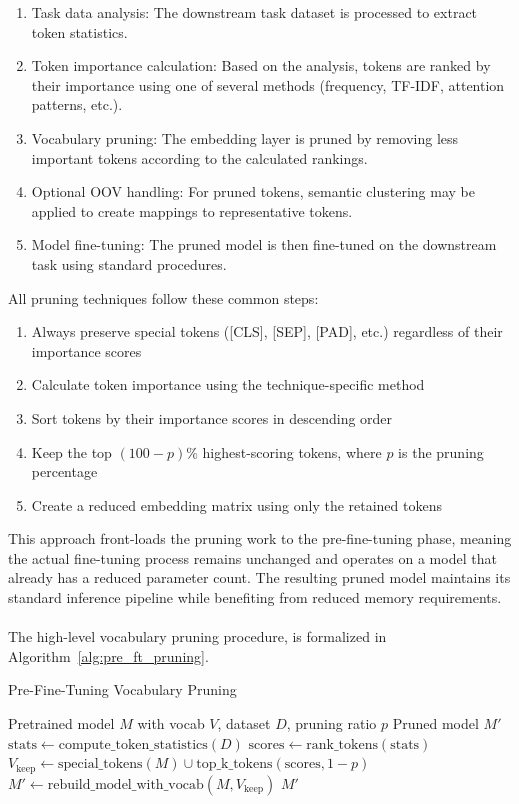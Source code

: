 \documentclass[twocolumn]{article}
\begin{document}
\begin{enumerate}
    \item Task data analysis: The downstream task dataset is processed to extract token statistics.
    \item Token importance calculation: Based on the analysis, tokens are ranked by their importance using one of several methods (frequency, TF-IDF, attention patterns, etc.).
    \item Vocabulary pruning: The embedding layer is pruned by removing less important tokens according to the calculated rankings.
    \item Optional OOV handling: For pruned tokens, semantic clustering may be applied to create mappings to representative tokens.
    \item Model fine-tuning: The pruned model is then fine-tuned on the downstream task using standard procedures.
\end{enumerate}
All pruning techniques follow these common steps:
\begin{enumerate}
    \item Always preserve special tokens ([CLS], [SEP], [PAD], etc.) regardless of their importance scores
    \item Calculate token importance using the technique-specific method
    \item Sort tokens by their importance scores in descending order
    \item Keep the top $(100-p)\%$ highest-scoring tokens, where $p$ is the pruning percentage
    \item Create a reduced embedding matrix using only the retained tokens
\end{enumerate}
This approach front-loads the pruning work to the pre-fine-tuning phase, meaning the actual fine-tuning process remains unchanged and operates on a model that already has a reduced parameter count. The resulting pruned model maintains its standard inference pipeline while benefiting from reduced memory requirements.
\\ \\
The high-level vocabulary pruning procedure, is formalized in Algorithm~\ref{alg:pre_ft_pruning}.

\begin{algorithm}[H]
\small
\caption{Pre-Fine-Tuning Vocabulary Pruning}
\label{alg:pre_ft_pruning}
\begin{algorithmic}[1]
\Require Pretrained model $M$ with vocab $V$, dataset $D$, pruning ratio $p$
\Ensure Pruned model $M'$
\State $\text{stats} \gets \text{compute\_token\_statistics}(D)$
\State $\text{scores} \gets \text{rank\_tokens}(\text{stats})$
\State $V_{\text{keep}} \gets \text{special\_tokens}(M)\cup\text{top\_k\_tokens}(\text{scores}, 1 - p)$
\State $M' \gets \text{rebuild\_model\_with\_vocab}(M, V_{\text{keep}})$
\State \Return $M'$
\end{algorithmic}
\end{algorithm}
\end{document}
